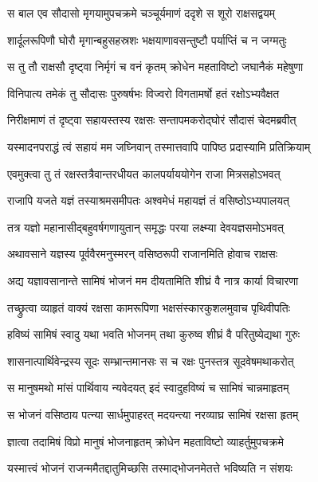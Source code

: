 \twolineshloka
{स बाल एव सौदासो मृगयामुपचक्रमे}
{चञ्चूर्यमाणं ददृशे स शूरो राक्षसद्वयम्} %

\twolineshloka
{शार्दूलरूपिणौ घोरौ मृगान्बहुसहस्रशः}
{भक्षयाणावसन्तुष्टौ पर्याप्तिं च न जग्मतुः} %

\twolineshloka
{स तु तौ राक्षसौ दृष्ट्वा निर्मृगं च वनं कृतम्}
{क्रोधेन महताविष्टो जघानैकं महेषुणा} %

\twolineshloka
{विनिपात्य तमेकं तु सौदासः पुरुषर्षभः}
{विज्वरो विगतामर्षो हतं रक्षोऽभ्यवैक्षत} %

\twolineshloka
{निरीक्षमाणं तं दृष्ट्वा सहायस्तस्य रक्षसः}
{सन्तापमकरोद्घोरं सौदासं चेदमब्रवीत्} %

\twolineshloka
{यस्मादनपराद्धं त्वं सहायं मम जघ्निवान्}
{तस्मात्तवापि पापिष्ठ प्रदास्यामि प्रतिक्रियाम्} %

\twolineshloka
{एवमुक्त्वा तु तं रक्षस्तत्रैवान्तरधीयत}
{कालपर्याययोगेन राजा मित्रसहोऽभवत्} %

\twolineshloka
{राजापि यजते यज्ञं तस्याश्रमसमीपतः}
{अश्वमेधं महायज्ञं तं वसिष्ठोऽभ्यपालयत्} %

\twolineshloka
{तत्र यज्ञो महानासीद्बहुवर्षगणायुतान्}
{समृद्धः परया लक्ष्म्या देवयज्ञसमोऽभवत्} %

\twolineshloka
{अथावसाने यज्ञस्य पूर्ववैरमनुस्मरन्}
{वसिष्ठरूपी राजानमिति होवाच राक्षसः} %

\twolineshloka
{अद्य यज्ञावसानान्ते सामिषं भोजनं मम}
{दीयतामिति शीघ्रं वै नात्र कार्या विचारणा} %

\twolineshloka
{तच्छ्रुत्वा व्याहृतं वाक्यं रक्षसा कामरूपिणा}
{भक्षसंस्कारकुशलमुवाच पृथिवीपतिः} %

\twolineshloka
{हविष्यं सामिषं स्वादु यथा भवति भोजनम्}
{तथा कुरुष्व शीघ्रं वै परितुष्येद्यथा गुरुः} %

\twolineshloka
{शासनात्पार्थिवेन्द्रस्य सूदः सम्भ्रान्तमानसः}
{स च रक्षः पुनस्तत्र सूदवेषमथाकरोत्} %

\twolineshloka
{स मानुषमथो मांसं पार्थिवाय न्यवेदयत्}
{इदं स्वादुहविष्यं च सामिषं चान्नमाहृतम्} %

\twolineshloka
{स भोजनं वसिष्ठाय पत्न्या सार्धमुपाहरत्}
{मदयन्त्या नरव्याघ्र सामिषं रक्षसा हृतम्} %

\twolineshloka
{ज्ञात्वा तदामिषं विप्रो मानुषं भोजनाहृतम्}
{क्रोधेन महताविष्टो व्याहर्तुमुपचक्रमे} %

\twolineshloka
{यस्मात्त्वं भोजनं राजन्ममैतद्दातुमिच्छसि}
{तस्माद्भोजनमेतत्ते भविष्यति न संशयः} %

